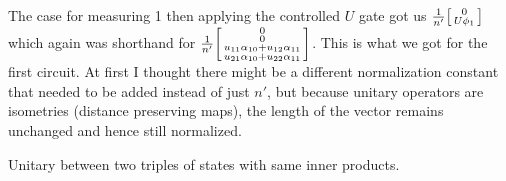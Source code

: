 \documentclass[boxes,pages]{homework}
\begin{document}
\begin{solution}
	The case for measuring 1 then applying the controlled $U$ gate got us $\frac{1}{n'}\smqty[0 \\ U\phi_1]$ which again was shorthand for $\frac{1}{n'}\smqty[0 \\ 0 \\ u_{11}\alpha_{10} + u_{12}\alpha_{11} \\ u_{21}\alpha_{10} + u_{22}\alpha_{11}]$. This is what we got for the first circuit. At first I thought there might be a different normalization constant that needed to be added instead of just $n'$, but because unitary operators are isometries (distance preserving maps), the length of the vector remains unchanged and hence still normalized.
\end{solution}

\begin{problem}\label{prob:two}
Unitary between two triples of states with same inner products.
\end{problem}
\end{document}
